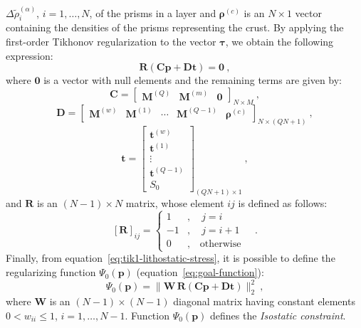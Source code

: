\documentclass[manuscript]{geophysics}
\begin{document}
$\Delta \tilde{\rho}^{(\alpha)}_{i}$, $i = 1, \dots, N$, of the prisms in a layer and
$\boldsymbol{\rho}^{(c)}$ is an $N \times 1$ vector containing the densities of the prisms
representing the crust. By applying the first-order Tikhonov regularization
\citep{aster-etal2005} to the vector $\boldsymbol{\tau}$, we obtain the
following expression:
\begin{equation}
\mathbf{R} \left( \mathbf{C} \mathbf{p} + \mathbf{D} \mathbf{t} \right) = \mathbf{0} 
\: ,
\label{eq:tik1-lithostatic-stress}
\end{equation}
where $\mathbf{0}$ is a vector with null elements and the remaining terms are given by:
\begin{equation}
\mathbf{C} = \begin{bmatrix}
\mathbf{M}^{(Q)} & \mathbf{M}^{(m)} & \mathbf{0}
\end{bmatrix}_{N \times M} \: ,
\label{eq:matrix-C}
\end{equation}
\begin{equation}
\mathbf{D} = \begin{bmatrix}
\mathbf{M}^{(w)} & \mathbf{M}^{(1)} & \cdots & \mathbf{M}^{(Q-1)} &
\boldsymbol{\rho}^{(c)}
\end{bmatrix}_{N \times \left( QN + 1 \right)} \: ,
\label{eq:matrix-D}
\end{equation}
\begin{equation}
\mathbf{t} = \begin{bmatrix}
\mathbf{t}^{(w)} \\ \mathbf{t}^{(1)} \\ \vdots \\ \mathbf{t}^{(Q-1)} \\ S_{0}
\end{bmatrix}_{\left( QN + 1 \right) \times 1}\: ,
\label{eq:vector-t}
\end{equation}
and $\mathbf{R}$ is an $\left( N-1 \right) \times N$ matrix, whose element 
$ij$ is defined as follows:
\begin{equation}
\left[ \mathbf{R} \right]_{ij} = \begin{cases}
1 &, \quad j = i \\
-1 &, \quad j = i + 1 \\
0 &, \quad \text{otherwise}
\end{cases} \quad .
\label{eq:matrix-R}
\end{equation}
Finally, from equation~\ref{eq:tik1-lithostatic-stress}, it is possible to
define the regularizing function $\Psi_{0}(\mathbf{p})$ 
(equation~\ref{eq:goal-function}): 
\begin{equation}
\Psi_{0}(\mathbf{p}) = \| \mathbf{W} \, \mathbf{R} \left( \mathbf{C} \mathbf{p} + \mathbf{D}
\mathbf{t} \right) \|_{2}^{2} \: ,
\label{eq:isostatic-constraint-function}
\end{equation}
where $\mathbf{W}$ is an $(N - 1) \times (N - 1)$ diagonal matrix having constant
elements $0 < w_{ii} \le 1$, $i = 1, \dots, N - 1$. 
Function $\Psi_{0}(\mathbf{p})$ defines the \textit{Isostatic constraint}.
\end{document}
